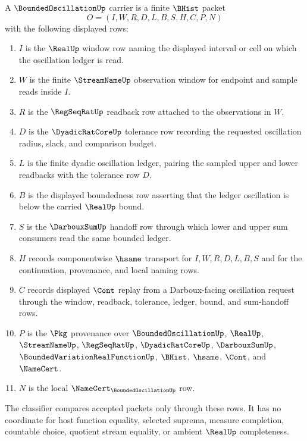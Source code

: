 \begin{definition}
\label{def:bounded-oscillation-carrier}
A $\BoundedOscillationUp$ carrier is a finite $\BHist$ packet
$$
O=(I,W,R,D,L,B,S,H,C,P,N)
$$
with the following displayed rows:
\begin{enumerate}
\item $I$ is the $\RealUp$ window row naming the displayed interval or cell on which the oscillation ledger is read.
\item $W$ is the finite $\StreamNameUp$ observation window for endpoint and sample reads inside $I$.
\item $R$ is the $\RegSeqRatUp$ readback row attached to the observations in $W$.
\item $D$ is the $\DyadicRatCoreUp$ tolerance row recording the requested oscillation radius, slack, and comparison budget.
\item $L$ is the finite dyadic oscillation ledger, pairing the sampled upper and lower readbacks with the tolerance row $D$.
\item $B$ is the displayed boundedness row asserting that the ledger oscillation is below the carried $\RealUp$ bound.
\item $S$ is the $\DarbouxSumUp$ handoff row through which lower and upper sum consumers read the same bounded ledger.
\item $H$ records componentwise $\hsame$ transport for $I,W,R,D,L,B,S$ and for the continuation, provenance, and local naming rows.
\item $C$ records displayed $\Cont$ replay from a Darboux-facing oscillation request through the window, readback, tolerance, ledger, bound, and sum-handoff rows.
\item $P$ is the $\Pkg$ provenance over $\BoundedOscillationUp$, $\RealUp$, $\StreamNameUp$, $\RegSeqRatUp$, $\DyadicRatCoreUp$, $\DarbouxSumUp$, $\BoundedVariationRealFunctionUp$, $\BHist$, $\hsame$, $\Cont$, and $\NameCert$.
\item $N$ is the local $\NameCert_{\BoundedOscillationUp}$ row.
\end{enumerate}
The classifier compares accepted packets only through these rows. It has no coordinate for host function equality, selected suprema, measure completion, countable choice, quotient stream equality, or ambient $\RealUp$ completeness.
\end{definition}

